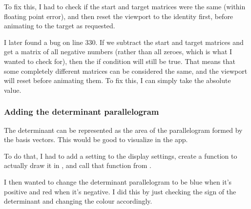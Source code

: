 \documentclass[../development.tex]{subfiles}
\begin{document}
To fix this, I had to check if the start and target matrices were the same (within floating point error), and then reset the viewport to the identity first, before animating to the target as requested.


I later found a bug on line 330. If we subtract the start and target matrices and get a matrix of all negative numbers (rather than all zeroes, which is what I wanted to check for), then the if condition will still be true. That means that some completely different matrices can be considered the same, and the viewport will reset before animating them. To fix this, I can simply take the absolute value.


\subsubsection{Adding the determinant parallelogram\label{development:adding-display-settings:adding-the-determinant-parallelogram}}

The determinant can be represented as the area of the parallelogram formed by the basis vectors. This would be good to visualize in the app.

To do that, I had to add a setting to the display settings, create a function to actually draw it in , and call that function from .




I then wanted to change the determinant parallelogram to be blue when it's positive and red when it's negative. I did this by just checking the sign of the determinant and changing the colour accordingly.

\end{document}
